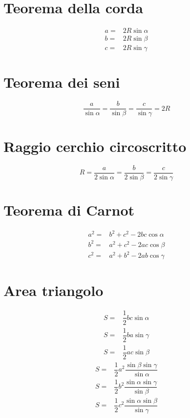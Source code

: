 \section{Teorema della corda}
\begin{align*}
a=&2R\sin\alpha\\
b=&2R\sin\beta\\
c=&2R\sin\gamma
\end{align*}
\section{Teorema dei seni}
\begin{equation*}
\dfrac{a}{\sin\alpha}=\dfrac{b}{\sin\beta}=\dfrac{c}{\sin\gamma}=2R
\end{equation*}
\section{Raggio cerchio circoscritto}
\begin{equation*}
R=\dfrac{a}{2\sin\alpha}=\dfrac{b}{2\sin\beta}=\dfrac{c}{2\sin\gamma}
\end{equation*}
\section{Teorema di Carnot}
\begin{align*}
a^2=&b^2+c^2-2bc\cos\alpha\\
b^2=&a^2+c^2-2ac\cos\beta\\
c^2=&a^2+b^2-2ab\cos\gamma
\end{align*}
\section{Area triangolo}
\begin{align*}
S=&\dfrac{1}{2}bc\sin\alpha\\
S=&\dfrac{1}{2}ba\sin\gamma\\
S=&\dfrac{1}{2}ac\sin\beta
\end{align*}
\begin{align*}
S=&\dfrac{1}{2}a^2\dfrac{\sin\beta\sin\gamma}{\sin\alpha}\\
S=&\dfrac{1}{2}b^2\dfrac{\sin\alpha\sin\gamma}{\sin\beta}\\
S=&\dfrac{1}{2}c^2\dfrac{\sin\alpha\sin\beta}{\sin\gamma}
\end{align*}